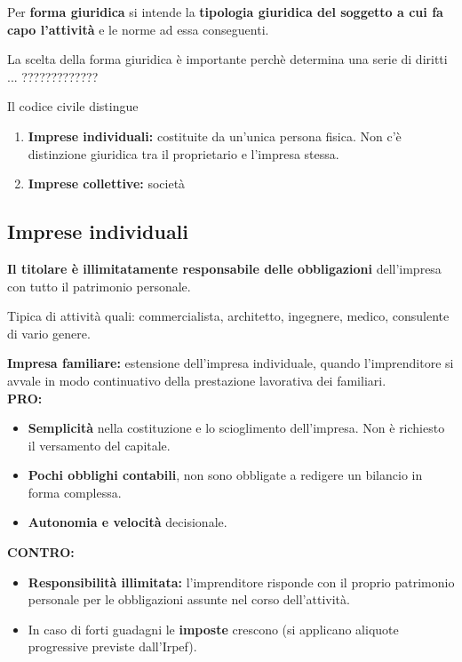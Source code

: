 \documentclass[../main.tex]{subfiles}
\begin{document}
Per \textbf{forma giuridica} si intende la \textbf{tipologia giuridica del soggetto a cui fa capo l'attività} e le norme ad essa conseguenti.

La scelta della forma giuridica è importante perchè determina una serie di diritti ... ?????????????

Il codice civile distingue

\begin{enumerate}
\item \textbf{Imprese individuali:} costituite  da un'unica persona fisica. Non c'è distinzione giuridica tra il proprietario e l'impresa stessa.

\item \textbf{Imprese collettive:} società
\end{enumerate}

\subsection{Imprese individuali}

\textbf{Il titolare è illimitatamente responsabile delle obbligazioni} dell'impresa con tutto il patrimonio personale.

Tipica di attività quali: commercialista, architetto, ingegnere, medico, consulente di vario genere.

\textbf{Impresa familiare:} estensione dell'impresa individuale, quando l'imprenditore si avvale in modo continuativo della prestazione lavorativa dei familiari. \\

\textbf{PRO:}
\begin{itemize}
\item \textbf{Semplicità} nella costituzione e lo scioglimento dell'impresa. Non è richiesto il versamento del capitale.

\item \textbf{Pochi obblighi contabili}, non sono obbligate a redigere un bilancio in forma complessa.

\item \textbf{Autonomia e velocità} decisionale.
\end{itemize}

\textbf{CONTRO:}
\begin{itemize}
\item \textbf{Responsibilità illimitata:} l'imprenditore risponde con il proprio patrimonio personale per le obbligazioni assunte nel corso dell'attività.

\item In caso di forti guadagni le \textbf{imposte} crescono (si applicano aliquote progressive previste dall'Irpef).

\end{itemize}
\end{document}
